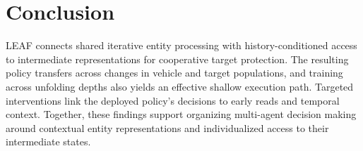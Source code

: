 \section{Conclusion}
LEAF connects shared iterative entity processing with history-conditioned access to intermediate representations for cooperative target protection. The resulting policy transfers across changes in vehicle and target populations, and training across unfolding depths also yields an effective shallow execution path. Targeted interventions link the deployed policy's decisions to early reads and temporal context. Together, these findings support organizing multi-agent decision making around contextual entity representations and individualized access to their intermediate states.
